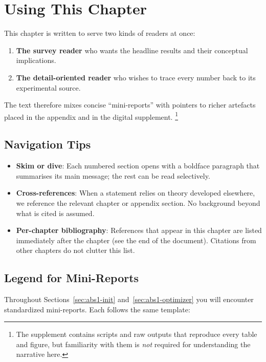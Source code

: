 ﻿%
\section{Using This Chapter}
\label{sec:abs1-using}

This chapter is written to serve two kinds of readers at once:

\begin{enumerate}
    \item \textbf{The survey reader} who wants the headline results and their
          conceptual implications.
    \item \textbf{The detail-oriented reader} who wishes to trace every number
          back to its experimental source.
\end{enumerate}

\noindent
The text therefore mixes concise “mini-reports” with pointers to richer
artefacts placed in the appendix and in the digital supplement.%
\footnote{The supplement contains scripts and raw outputs that reproduce every
table and figure, but familiarity with them is \emph{not} required for
understanding the narrative here.}

\subsection*{Navigation Tips}

\begin{itemize}
    \item \textbf{Skim or dive}: Each numbered section opens with a boldface
          paragraph that summarises its main message; the rest can be read
          selectively.
    \item \textbf{Cross-references}: When a statement relies on theory developed
          elsewhere, we reference the relevant chapter or appendix section.  No
          background beyond what is cited is assumed.
    \item \textbf{Per-chapter bibliography}: References that appear in this
          chapter are listed immediately after the chapter (see the end of the
          document).  Citations from other chapters do not clutter this list.
\end{itemize}

\subsection*{Legend for Mini-Reports}

Throughout Sections~\ref{sec:abs1-init} and~\ref{sec:abs1-optimizer} you will
encounter standardized mini-reports.  Each follows the same template:

